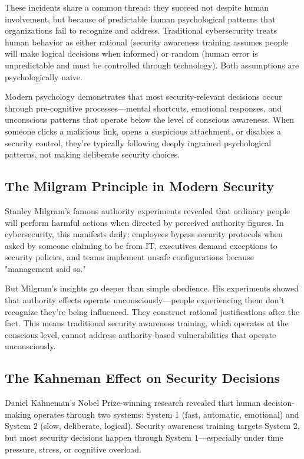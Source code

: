 \documentclass[11pt,a4paper]{article}
\begin{document}
These incidents share a common thread: they succeed not despite human involvement, but because of predictable human psychological patterns that organizations fail to recognize and address. Traditional cybersecurity treats human behavior as either rational (security awareness training assumes people will make logical decisions when informed) or random (human error is unpredictable and must be controlled through technology). Both assumptions are psychologically naive.

Modern psychology demonstrates that most security-relevant decisions occur through pre-cognitive processes—mental shortcuts, emotional responses, and unconscious patterns that operate below the level of conscious awareness. When someone clicks a malicious link, opens a suspicious attachment, or disables a security control, they're typically following deeply ingrained psychological patterns, not making deliberate security choices.

\subsection{The Milgram Principle in Modern Security}

Stanley Milgram's famous authority experiments revealed that ordinary people will perform harmful actions when directed by perceived authority figures\cite{milgram1974}. In cybersecurity, this manifests daily: employees bypass security protocols when asked by someone claiming to be from IT, executives demand exceptions to security policies, and teams implement unsafe configurations because "management said so."

But Milgram's insights go deeper than simple obedience. His experiments showed that authority effects operate unconsciously—people experiencing them don't recognize they're being influenced. They construct rational justifications after the fact. This means traditional security awareness training, which operates at the conscious level, cannot address authority-based vulnerabilities that operate unconsciously.

\subsection{The Kahneman Effect on Security Decisions}

Daniel Kahneman's Nobel Prize-winning research revealed that human decision-making operates through two systems: System 1 (fast, automatic, emotional) and System 2 (slow, deliberate, logical)\cite{kahneman2011}. Security awareness training targets System 2, but most security decisions happen through System 1—especially under time pressure, stress, or cognitive overload.
\end{document}
